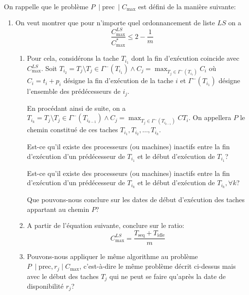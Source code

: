 \begin{td-exo}\,\\ %
	On rappelle que le problème \(P \ \mid \text{prec}\ \mid C_{\max}\) est défini de la manière suivante:

	

	\begin{enumerate}
		\item On veut montrer que pour n'importe quel ordonnancement de liste \(LS\) on a
		\begin{equation*}
			\frac{C_{\max}^{LS}}{C_{\max}^\ast} \leq 2 - \frac{1}{m}
		\end{equation*}

		\begin{enumerate}
			\item Pour cela, considérons la tache \(T_{i_1}\) dont la fin d'exécution coincide avec \(C_{\max}^{LS}\). 
			Soit \(T_{i_2} = T_j \setminus T_j \in \Gamma^-(T_{i_1}) \land C_j = \max_{T_j \in \Gamma^-(T_{i_1})} C_i\) où \(C_i = t_i + p_i\) désigne la fin d'exécution de la tache \(i\) et \(\Gamma^-(T_{i_1})\) désigne l'ensemble des prédécesseurs de \(i_j\).

			En procédant ainsi de suite, on a \(T_{i_k} = T_j \setminus T_j \in \Gamma^-(T_{i_{k-1}}) \land C_j = \max_{T_j \in \Gamma^-(T_{i_{k-1}})} CT_i\). On appellera \(P\) le chemin constitué de ces taches \(T_{i_1}, T_{i_2}, \ldots, T_{i_k}\).

			Est-ce qu'il existe des processeurs (ou machines) inactifs entre la fin d'exécution d'un prédécesseur de \(T_{i_1}\) et le début d'exécution de \(T_{i_1}\)?

			Est-ce qu'il existe des processeurs (ou machines) inactifs entre la fin d'exécution d'un prédécesseur de \(T_{i_k}\) et le début d'exécution de \(T_{i_k}, \forall k\)?
			
			Que pouvons-nous conclure sur les dates de début d'exécution des taches appartant au chemin \(P\)?

			\item A partir de l'équation suivante, conclure sur le ratio:
			\begin{equation*}
				C_{\max}^{LS} = \frac{T_{\text{seq}} + T_{\text{idle}}}{m}
			\end{equation*}

			\item Pouvons-nous appliquer le même algorithme au problème \(P \ \mid \text{prec}, r_j \mid C_{\max}\), c'est-à-dire le même problème décrit ci-dessus mais avec le début des taches \(T_j\) qui ne peut se faire qu'après la date de disponibilité \(r_j\)?
		\end{enumerate}


\end{enumerate}
\end{td-exo}
